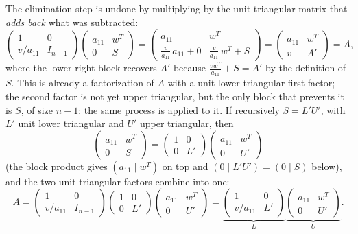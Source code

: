 \documentclass[11pt, a4paper]{article}
\begin{document}
The elimination step is undone by multiplying by the unit triangular matrix that \emph{adds back} what was subtracted:
\[
\begin{pmatrix} 1 & 0 \\ v / a_{11} & I_{n-1} \end{pmatrix}
\begin{pmatrix} a_{11} & w^T \\ 0 & S \end{pmatrix}
= \begin{pmatrix} a_{11} & w^T \\[2pt] \frac{v}{a_{11}} \, a_{11} + 0 & \frac{v}{a_{11}} \, w^T + S \end{pmatrix}
= \begin{pmatrix} a_{11} & w^T \\ v & A' \end{pmatrix} = A,
\]
where the lower right block recovers $A'$ because $\frac{v w^T}{a_{11}} + S = A'$ by the definition of $S$. This is already a factorization of $A$ with a unit lower triangular first factor; the second factor is not yet upper triangular, but the only block that prevents it is $S$, of size $n - 1$: the same process is applied to it. If recursively $S = L' U'$, with $L'$ unit lower triangular and $U'$ upper triangular, then
\[
\begin{pmatrix} a_{11} & w^T \\ 0 & S \end{pmatrix}
= \begin{pmatrix} 1 & 0 \\ 0 & L' \end{pmatrix}
\begin{pmatrix} a_{11} & w^T \\ 0 & U' \end{pmatrix}
\]
(the block product gives $(a_{11} \mid w^T)$ on top and $(0 \mid L'U') = (0 \mid S)$ below), and the two unit triangular factors combine into one:
\[
A = \begin{pmatrix} 1 & 0 \\ v/a_{11} & I_{n-1} \end{pmatrix}
\begin{pmatrix} 1 & 0 \\ 0 & L' \end{pmatrix}
\begin{pmatrix} a_{11} & w^T \\ 0 & U' \end{pmatrix}
= \underbrace{\begin{pmatrix} 1 & 0 \\ v/a_{11} & L' \end{pmatrix}}_{L}
\underbrace{\begin{pmatrix} a_{11} & w^T \\ 0 & U' \end{pmatrix}}_{U}.
\]
\end{document}
